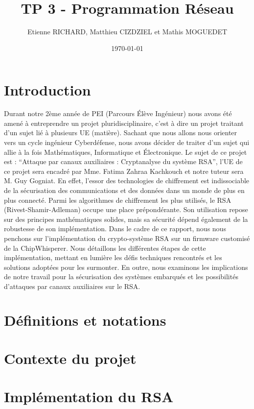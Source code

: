 \documentclass[12pt]{article}
\title{TP 3 - Programmation Réseau}	\let\Title\@title
\author{Etienne RICHARD, Matthieu CIZDZIEL et Mathis MOGUEDET} \let\Author\@author
\date{\today}           	\let\Date\@date
\begin{document}
\maketitle
\pagebreak

\tableofcontents
\pagebreak

\section*{Introduction}
Durant notre 2ème année de PEI (Parcours Élève Ingénieur) nous avons été amené à entreprendre un projet pluridisciplinaire, c'est à dire un projet traitant d'un sujet lié à plusieurs UE (matière). Sachant que nous allons nous orienter vers un cycle ingénieur Cyberdéfense, nous avons décider de traiter d'un sujet qui allie à la fois Mathématiques, Informatique et Électronique. Le sujet de ce projet est : ``Attaque par canaux auxiliaires : Cryptanalyse du système RSA'', l'UE de ce projet sera encadré par Mme. Fatima Zahraa Kachkouch et notre tuteur sera M. Guy Gogniat. En effet, l'essor des technologies de chiffrement est indissociable de la sécurisation des communications et des données dans un monde de plus en plus connecté. Parmi les algorithmes de chiffrement les plus utilisés, le RSA (Rivest-Shamir-Adleman) occupe une place prépondérante. Son utilisation repose sur des principes mathématiques solides, mais sa sécurité dépend également de la robustesse de son implémentation. Dans le cadre de ce rapport, nous nous penchons sur l'implémentation du crypto-système RSA sur un firmware customisé de la ChipWhisperer. Nous détaillons les différentes étapes de cette implémentation, mettant en lumière les défis techniques rencontrés et les solutions adoptées pour les surmonter. En outre, nous examinons les implications de notre travail pour la sécurisation des systèmes embarqués et les possibilités d'attaques par canaux auxiliaires sur le RSA.

\section{Définitions et notations}


\pagebreak
\section{Contexte du projet}


\pagebreak
\section{Implémentation du RSA}

\end{document}
